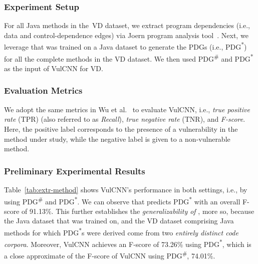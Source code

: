 \subsubsection*{\bf Experiment Setup}
For all Java methods in the~VD dataset, we extract program
dependencies (i.e., data and control-dependence edges) via Joern
program analysis tool~\cite{joern-2014}. Next, we leverage \tool that
was trained on a Java dataset
to generate the PDGs (i.e., PDG\textsuperscript{*}) for all the
complete methods in the VD dataset. We then used
PDG\textsuperscript{\#} and PDG\textsuperscript{*} as the input of
VulCNN for VD.

\subsubsection*{\bf Evaluation Metrics}
We adopt the same metrics in Wu et al.~\cite{wu2022vulcnn} to
evaluate VulCNN, i.e., \textit{true positive rate} (TPR) (also
referred to as \textit{Recall}), \textit{true negative rate} (TNR),
and \textit{F-score}. Here, the positive label corresponds to the
presence of a vulnerability in the method under study, while the
negative label is given to a non-vulnerable method.


\subsubsection*{\bf Preliminary Experimental Results}
Table~\ref{tab:extr-method} shows VulCNN's performance in both
settings, i.e., by using PDG\textsuperscript{\#} and
PDG\textsuperscript{*}. We can observe that \tool predicts
PDG\textsuperscript{*} with an overall F-score of 91.13\%. This
further establishes the {\em generalizability of \tool}, more so,
because the Java dataset that \tool was trained on, and the VD dataset
comprising Java methods for which PDG\textsuperscript{*}s were derived
come from two {\em entirely distinct code corpora}. Moreover, VulCNN
achieves an F-score of 73.26\% using PDG\textsuperscript{*}, which is
a close approximate of the F-score of VulCNN using
PDG\textsuperscript{\#}, 74.01\%.

